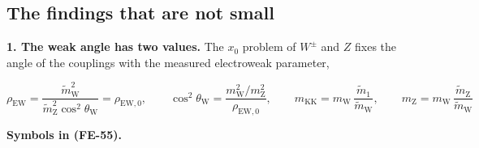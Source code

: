 \documentclass[
  10pt,
]{article}
\begin{document}
\hypertarget{the-findings-that-are-not-small}{%
\subsection{The findings that are not
small}\label{the-findings-that-are-not-small}}

\textbf{1. The weak angle has two values.} The \(x_0\) problem of
\(W^\pm\) and \(Z\) fixes the angle of the couplings with the measured
electroweak parameter,

\[
\rho_{\mathrm{EW}} = \frac{\tilde m_{\mathrm{W}}^2}{\tilde m_{\mathrm{Z}}^2\cos^2\theta_{\mathrm{W}}} =
 \rho_{\mathrm{EW},0},\qquad
\cos^2\theta_{\mathrm{W}} = \frac{m_{\mathrm{W}}^2/m_{\mathrm{Z}}^2}{\rho_{\mathrm{EW},0}},\qquad
m_{\mathrm{KK}} = m_{\mathrm{W}}\,\frac{\tilde m_1}{\tilde m_{\mathrm{W}}},\qquad
m_{\mathrm{Z}} = m_{\mathrm{W}}\,\frac{\tilde m_{\mathrm{Z}}}{\tilde m_{\mathrm{W}}} \tag{FE-55}
\]

\textbf{Symbols in (FE-55).}
\end{document}
